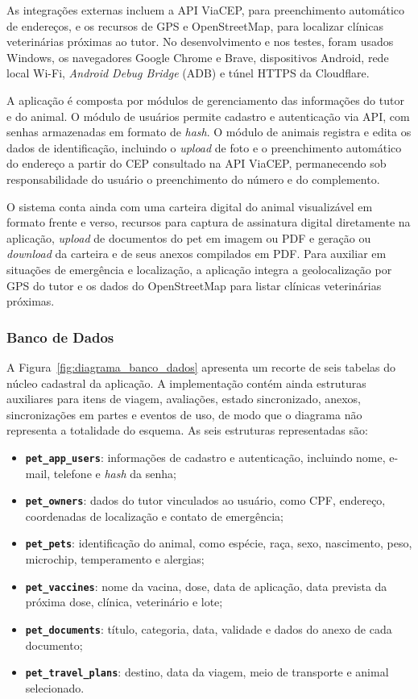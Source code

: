 \documentclass{UNESC}
\begin{document}
As integrações externas incluem a API ViaCEP, para preenchimento automático de endereços, e os recursos de GPS e OpenStreetMap, para localizar clínicas veterinárias próximas ao tutor. No desenvolvimento e nos testes, foram usados Windows, os navegadores Google Chrome e Brave, dispositivos Android, rede local Wi-Fi, \textit{Android Debug Bridge} (ADB) e túnel HTTPS da Cloudflare.

A aplicação é composta por módulos de gerenciamento das informações do tutor e do animal. O módulo de usuários permite cadastro e autenticação via API, com senhas armazenadas em formato de \textit{hash}. O módulo de animais registra e edita os dados de identificação, incluindo o \textit{upload} de foto e o preenchimento automático do endereço a partir do CEP consultado na API ViaCEP, permanecendo sob responsabilidade do usuário o preenchimento do número e do complemento.

O sistema conta ainda com uma carteira digital do animal visualizável em formato frente e verso, recursos para captura de assinatura digital diretamente na aplicação, \textit{upload} de documentos do pet em imagem ou PDF e geração ou \textit{download} da carteira e de seus anexos compilados em PDF. Para auxiliar em situações de emergência e localização, a aplicação integra a geolocalização por GPS do tutor e os dados do OpenStreetMap para listar clínicas veterinárias próximas.

\subsubsection{Banco de Dados}

A Figura~\ref{fig:diagrama_banco_dados} apresenta um recorte de seis tabelas do núcleo cadastral da aplicação. A implementação contém ainda estruturas auxiliares para itens de viagem, avaliações, estado sincronizado, anexos, sincronizações em partes e eventos de uso, de modo que o diagrama não representa a totalidade do esquema. As seis estruturas representadas são:

\begin{itemize}
    \item \textbf{\texttt{pet\_app\_users}}: informações de cadastro e autenticação, incluindo nome, e-mail, telefone e \textit{hash} da senha;
    \item \textbf{\texttt{pet\_owners}}: dados do tutor vinculados ao usuário, como CPF, endereço, coordenadas de localização e contato de emergência;
    \item \textbf{\texttt{pet\_pets}}: identificação do animal, como espécie, raça, sexo, nascimento, peso, microchip, temperamento e alergias;
    \item \textbf{\texttt{pet\_vaccines}}: nome da vacina, dose, data de aplicação, data prevista da próxima dose, clínica, veterinário e lote;
    \item \textbf{\texttt{pet\_documents}}: título, categoria, data, validade e dados do anexo de cada documento;
    \item \textbf{\texttt{pet\_travel\_plans}}: destino, data da viagem, meio de transporte e animal selecionado.
\end{itemize}
\end{document}
